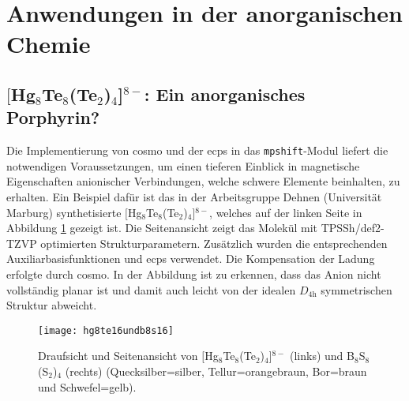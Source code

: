 \section{Anwendungen in der anorganischen Chemie}
\FloatBarrier
\subsection{\texorpdfstring{$[$Hg$_8$Te$_8$(Te$_2$)$_4$]$^{8-}$}{[Hg\_8Te\_8(Te\_2)\_4]8-}: Ein anorganisches Porphyrin?}\label{anorgporh}
Die Implementierung von \ac{cosmo}\supercite{klamt1993cosmo} und der \acp{ecp} in das \texttt{mpshift}-Modul liefert die notwendigen Voraussetzungen, um einen tieferen Einblick in magnetische Eigenschaften anionischer Verbindungen, welche schwere Elemente beinhalten, zu erhalten. Ein Beispiel dafür ist das in der Arbeitsgruppe Dehnen (Universität Marburg) synthetisierte $[$Hg$_8$Te$_8$(Te$_2$)$_4$]$^{8-}$,\supercite{dehnenhg4te8} welches auf der linken Seite in Abbildung \ref{abb:hg8te16undb8s16} gezeigt ist. Die Seitenansicht zeigt das Molekül mit TPSSh\supercite{tao2003climbing}/def2-TZVP\supercite{weigend2005balanced} optimierten Strukturparametern. Zusätzlich wurden die entsprechenden Auxiliarbasisfunktionen\supercite{weigend2006accurate} und \acp{ecp}\supercite{peterson2003systematically} verwendet. Die Kompensation der Ladung erfolgte durch \ac{cosmo}. In der Abbildung ist zu erkennen, dass das Anion nicht vollständig planar ist und damit auch leicht von der idealen $D_{4\textrm{h}}$ symmetrischen Struktur abweicht. 
\begin{figure}[ht!]
	\centering
	\texttt{[image: hg8te16undb8s16]}
	\captionsetup{figurewithin = chapter}
	\captionsetup{font=small, labelfont=bf}\caption[{Abbildung von $[$Hg$_8$Te$_8$(Te$_2$)$_4$]$^{8-}$ und B$_8$S$_8$(S$_2$)$_4$}]{Draufsicht und Seitenansicht von $[$Hg$_8$Te$_8$(Te$_2$)$_4$]$^{8-}$ (links) und B$_8$S$_8$(S$_2$)$_4$ (rechts) (Quecksilber=silber, Tellur=orangebraun, Bor=braun und Schwefel=gelb).}
\label{abb:hg8te16undb8s16}
\end{figure}

